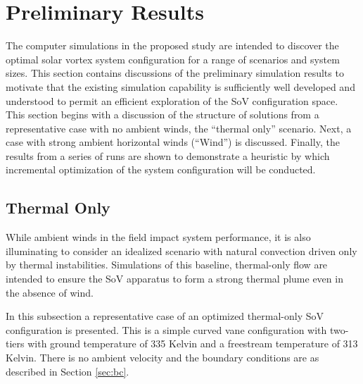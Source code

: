  
\section{Preliminary Results}
\label{sec:results}

%
%
%
%

The computer simulations in the proposed study are intended to discover
the optimal solar vortex system configuration for a range of scenarios
and system sizes. This section contains discussions of the preliminary
simulation results to motivate that the existing simulation capability
is sufficiently well developed and understood to permit an efficient
exploration of the SoV configuration space. 
This section begins with a discussion of the structure of solutions from
a representative case with no ambient winds, the ``thermal only''
scenario. Next, a case with strong ambient horizontal winds (``Wind'')
is discussed. Finally, the results from a series of runs are shown to
demonstrate a heuristic by which incremental optimization of the system
configuration will be conducted. 



\subsection{Thermal Only}

While ambient winds in the field impact system performance, it is
also illuminating to consider an idealized scenario with natural convection
driven only by thermal instabilities. Simulations of this baseline,
thermal-only flow are intended to ensure the SoV apparatus to form a
strong thermal plume even in the absence of wind. 

In this subsection a representative case of an optimized thermal-only SoV
configuration is presented. This is a simple curved vane configuration with
two-tiers with ground temperature of 335 Kelvin and a freestream
temperature of 313 Kelvin. There is no ambient velocity and the boundary
conditions are as described in Section \ref{sec:bc}. 


